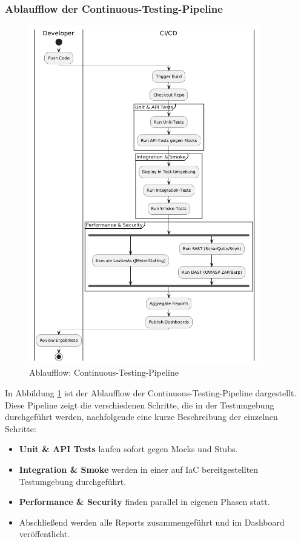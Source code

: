 \subsubsection{Ablaufflow der Continuous-Testing-Pipeline}

\begin{figure}[h!]
\centering
    \includegraphics[width=0.9\textwidth]{fig/ablauf_pipeline.png}
    \caption{Ablaufflow: Continuous-Testing-Pipeline}
    \label{fig:flow}
\end{figure}

In Abbildung \ref{fig:flow} ist der Ablaufflow der Continuous-Testing-Pipeline dargestellt.
Diese Pipeline zeigt die verschiedenen Schritte, die in der Testumgebung durchgeführt werden,
nachfolgende eine kurze Beschreibung der einzelnen Schritte:

\begin{itemize}
    \item \textbf{Unit \& API Tests} laufen sofort gegen Mocks und Stubs.
    \item \textbf{Integration \& Smoke} werden in einer auf IaC bereitgestellten Testumgebung durchgeführt.
    \item \textbf{Performance \& Security} finden parallel in eigenen Phasen statt.
    \item Abschließend werden alle Reports zusammengeführt und im Dashboard veröffentlicht.
\end{itemize}  

